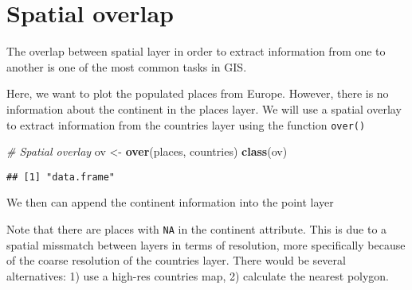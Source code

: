 \documentclass[]{book}
\newenvironment{Shaded}{\begin{snugshade}}{\end{snugshade}}
\newcommand{\CommentTok}[1]{\textcolor[rgb]{0.56,0.35,0.01}{\textit{#1}}}
\newcommand{\DataTypeTok}[1]{\textcolor[rgb]{0.13,0.29,0.53}{#1}}
\newcommand{\DecValTok}[1]{\textcolor[rgb]{0.00,0.00,0.81}{#1}}
\newcommand{\KeywordTok}[1]{\textcolor[rgb]{0.13,0.29,0.53}{\textbf{#1}}}
\newcommand{\NormalTok}[1]{#1}
\newcommand{\OperatorTok}[1]{\textcolor[rgb]{0.81,0.36,0.00}{\textbf{#1}}}
\newcommand{\OtherTok}[1]{\textcolor[rgb]{0.56,0.35,0.01}{#1}}
\newcommand{\StringTok}[1]{\textcolor[rgb]{0.31,0.60,0.02}{#1}}
\begin{document}
\hypertarget{spatial-overlap}{%
\section{Spatial overlap}\label{spatial-overlap}}

The overlap between spatial layer in order to extract information from one to another is one of the most common tasks in GIS.

Here, we want to plot the populated places from Europe. However, there is no information about the continent in the places layer. We will use a spatial overlay to extract information from the countries layer using the function \texttt{over()}

\begin{Shaded}
\begin{Highlighting}[]
\CommentTok{# Spatial overlay}
\NormalTok{ov <-}\StringTok{ }\KeywordTok{over}\NormalTok{(places, countries)}
\KeywordTok{class}\NormalTok{(ov)}
\end{Highlighting}
\end{Shaded}

\begin{verbatim}
## [1] "data.frame"
\end{verbatim}

We then can append the continent information into the point layer

\begin{Shaded}
\end{Shaded}

Note that there are places with \texttt{NA} in the continent attribute. This is due to a spatial missmatch between layers in terms of resolution, more specifically because of the coarse resolution of the countries layer. There would be several alternatives: 1) use a high-res countries map, 2) calculate the nearest polygon.

\begin{Shaded}
\end{Shaded}
\end{document}
